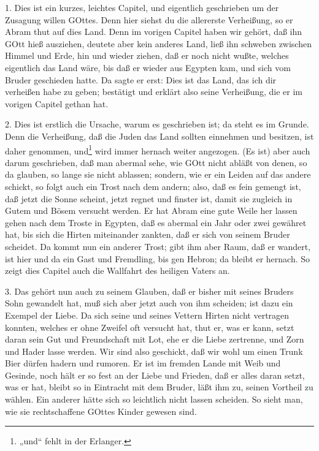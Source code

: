 1. Dies ist ein kurzes, leichtes Capitel, und eigentlich geschrieben um der Zusagung willen GOttes. Denn hier siehst du die allererste Verheißung, so er Abram thut auf dies Land. Denn im vorigen Capitel haben wir gehört, daß ihn GOtt hieß ausziehen, deutete aber kein anderes Land, ließ ihn schweben zwischen Himmel und Erde, hin und wieder ziehen, daß er noch nicht wußte, welches eigentlich das Land wäre, bis daß er wieder aus Egypten kam, und sich vom Bruder geschieden hatte. Da sagte er erst: Dies ist das Land, das ich dir verheißen habe zu geben; bestätigt und erklärt also seine Verheißung, die er im vorigen Capitel gethan hat.

2. Dies ist erstlich die Ursache, warum es geschrieben ist; da steht es im Grunde. Denn die Verheißung, daß die Juden das Land sollten einnehmen und besitzen, ist daher genommen, und\footnote{„und“ fehlt in der Erlanger.} wird immer hernach weiter angezogen. (Es ist) aber auch darum geschrieben, daß man abermal sehe, wie GOtt nicht abläßt von denen, so da glauben, so lange sie nicht ablassen; sondern, wie er ein Leiden auf das andere schickt, so folgt auch ein Trost nach dem andern; also, daß es fein gemengt ist, daß jetzt die Sonne scheint, jetzt regnet und finster ist, damit sie zugleich in Gutem und Bösem versucht werden. Er hat Abram eine gute Weile her lassen gehen nach dem Troste in Egypten, daß es abermal ein Jahr oder zwei gewähret hat, bis sich die Hirten miteinander zankten, daß er sich von seinem Bruder scheidet. Da kommt nun ein anderer Trost; gibt ihm aber Raum, daß er wandert, ist hier und da ein Gast und Fremdling, bis gen Hebron; da bleibt er hernach. So zeigt dies Capitel auch die Wallfahrt des heiligen Vaters an.

3. Das gehört nun auch zu seinem Glauben, daß er bisher mit seines Bruders Sohn gewandelt hat, muß sich aber jetzt auch von ihm scheiden; ist dazu ein Exempel der Liebe. Da sich seine und seines Vettern Hirten nicht vertragen konnten, welches er ohne Zweifel oft versucht hat, thut er, was er kann, setzt daran sein Gut und Freundschaft mit Lot, ehe er die Liebe zertrenne, und Zorn und Hader lasse werden. Wir sind also geschickt, daß wir wohl um einen Trunk Bier dürfen hadern und rumoren. Er ist im fremden Lande mit Weib und Gesinde, noch hält er so fest an der Liebe und Frieden, daß er alles daran setzt, was er hat, bleibt so in Eintracht mit dem Bruder, läßt ihm zu, seinen Vortheil zu wählen. Ein anderer hätte sich so leichtlich nicht lassen scheiden. So sieht man, wie sie rechtschaffene GOttes Kinder gewesen sind.

